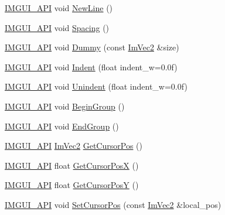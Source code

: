 \begin{DoxyCompactItemize}
\item 
\mbox{\hyperlink{imgui_8h_a43829975e84e45d1149597467a14bbf5}{I\+M\+G\+U\+I\+\_\+\+A\+PI}} void \mbox{\hyperlink{namespace_im_gui_a77f8b0a33e5335f98661f99e720411da}{New\+Line}} ()
\item 
\mbox{\hyperlink{imgui_8h_a43829975e84e45d1149597467a14bbf5}{I\+M\+G\+U\+I\+\_\+\+A\+PI}} void \mbox{\hyperlink{namespace_im_gui_a2659e2bfe84b4cad0facd65d5c1ac90d}{Spacing}} ()
\item 
\mbox{\hyperlink{imgui_8h_a43829975e84e45d1149597467a14bbf5}{I\+M\+G\+U\+I\+\_\+\+A\+PI}} void \mbox{\hyperlink{namespace_im_gui_a8b0fb07113251301ff897b8578a53f34}{Dummy}} (const \mbox{\hyperlink{struct_im_vec2}{Im\+Vec2}} \&size)
\item 
\mbox{\hyperlink{imgui_8h_a43829975e84e45d1149597467a14bbf5}{I\+M\+G\+U\+I\+\_\+\+A\+PI}} void \mbox{\hyperlink{namespace_im_gui_a6c7b9f2d60951462eeebad80154a8926}{Indent}} (float indent\+\_\+w=0.\+0f)
\item 
\mbox{\hyperlink{imgui_8h_a43829975e84e45d1149597467a14bbf5}{I\+M\+G\+U\+I\+\_\+\+A\+PI}} void \mbox{\hyperlink{namespace_im_gui_ad577d36753634c9bbdc3750b0e5217f5}{Unindent}} (float indent\+\_\+w=0.\+0f)
\item 
\mbox{\hyperlink{imgui_8h_a43829975e84e45d1149597467a14bbf5}{I\+M\+G\+U\+I\+\_\+\+A\+PI}} void \mbox{\hyperlink{namespace_im_gui_a42407e196b7ed2a8755bff28aae9805f}{Begin\+Group}} ()
\item 
\mbox{\hyperlink{imgui_8h_a43829975e84e45d1149597467a14bbf5}{I\+M\+G\+U\+I\+\_\+\+A\+PI}} void \mbox{\hyperlink{namespace_im_gui_a05fc97fc64f28a55486087f503d9a622}{End\+Group}} ()
\item 
\mbox{\hyperlink{imgui_8h_a43829975e84e45d1149597467a14bbf5}{I\+M\+G\+U\+I\+\_\+\+A\+PI}} \mbox{\hyperlink{struct_im_vec2}{Im\+Vec2}} \mbox{\hyperlink{namespace_im_gui_a2fa4eb57e0f73b90e8edcd226a0cc7d5}{Get\+Cursor\+Pos}} ()
\item 
\mbox{\hyperlink{imgui_8h_a43829975e84e45d1149597467a14bbf5}{I\+M\+G\+U\+I\+\_\+\+A\+PI}} float \mbox{\hyperlink{namespace_im_gui_a022e32c808ac899e25847f4d65633b77}{Get\+Cursor\+PosX}} ()
\item 
\mbox{\hyperlink{imgui_8h_a43829975e84e45d1149597467a14bbf5}{I\+M\+G\+U\+I\+\_\+\+A\+PI}} float \mbox{\hyperlink{namespace_im_gui_a86e409551f256b542166989c558d41c1}{Get\+Cursor\+PosY}} ()
\item 
\mbox{\hyperlink{imgui_8h_a43829975e84e45d1149597467a14bbf5}{I\+M\+G\+U\+I\+\_\+\+A\+PI}} void \mbox{\hyperlink{namespace_im_gui_a51ea13c986360d8a2e868dc9eeac2115}{Set\+Cursor\+Pos}} (const \mbox{\hyperlink{struct_im_vec2}{Im\+Vec2}} \&local\+\_\+pos)

\end{DoxyCompactItemize}
